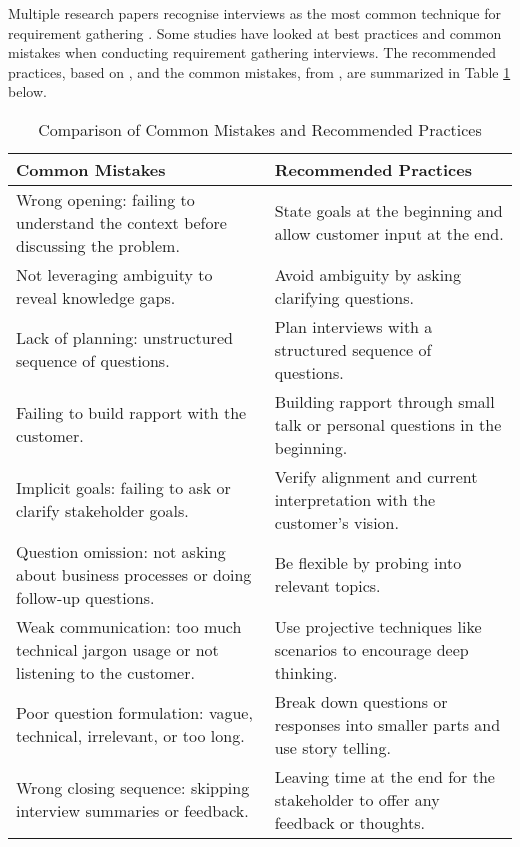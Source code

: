 Multiple research papers recognise interviews as the most common technique for requirement gathering \parencite{interviews5,interviews1,interviews2}. Some studies have looked at best practices and common mistakes when conducting requirement gathering interviews. The recommended practices, based on \textcite{interviews4, interviews3}, and the common mistakes, from \textcite{interviews1, interviews2}, are summarized in Table \ref{tab:comparison_mistakes_practices} below.

\begin{table}[h!]
    \centering
    \small
    \renewcommand{\arraystretch}{1.2}
    \begin{tabular}{|>{\arraybackslash}m{}|>{\arraybackslash}m{}|}
    \hline
    \textbf{Common Mistakes} & \textbf{Recommended Practices} \\ \hline
    Wrong opening: failing to understand the context before discussing the problem. & State goals at the beginning and allow customer input at the end. \\ \hline
    Not leveraging ambiguity to reveal knowledge gaps. & Avoid ambiguity by asking clarifying questions. \\ \hline
    Lack of planning: unstructured sequence of questions. & Plan interviews with a structured sequence of questions. \\ \hline
    Failing to build rapport with the customer. & Building rapport through small talk or personal questions in the beginning. \\ \hline
    Implicit goals: failing to ask or clarify stakeholder goals. & Verify alignment and current interpretation with the customer's vision. \\ \hline
    Question omission: not asking about business processes or doing follow-up questions. & Be flexible by probing into relevant topics. \\ \hline
    Weak communication: too much technical jargon usage or not listening to the customer. & Use projective techniques like scenarios to encourage deep thinking. \\ \hline
    Poor question formulation: vague, technical, irrelevant, or too long. & Break down questions or responses into smaller parts and use story telling.  \\ \hline
    Wrong closing sequence: skipping interview summaries or feedback. & Leaving time at the end for the stakeholder to offer any feedback or thoughts. \\ \hline
    \end{tabular}
    \caption{Comparison of Common Mistakes and Recommended Practices}
    \label{tab:comparison_mistakes_practices}
\end{table}

